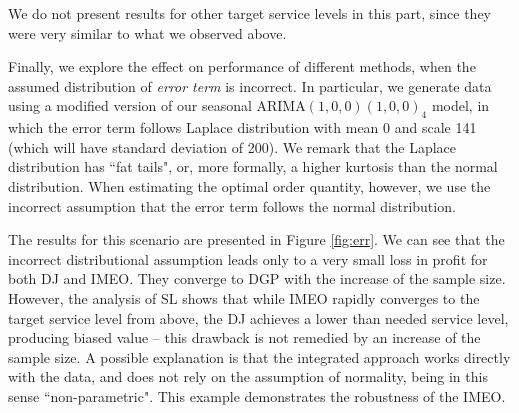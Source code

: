 \documentclass[a4paper,11pt]{article}
\begin{document}
We do not present results for other target service levels in this part, since they were very similar to what we observed above.
% 

Finally, we explore the effect on performance of different methods, when the assumed distribution of \emph{error term} is incorrect. In particular, we generate data using a modified version of our seasonal ARIMA$(1,0,0)(1,0,0)_4$ model, in which the error term follows Laplace distribution with mean 0 and scale 141 (which will have standard deviation of 200). We remark that the Laplace distribution has ``fat tails", or, more formally, a higher kurtosis than the normal distribution. When estimating the optimal order quantity, however, we use the incorrect assumption that the error term follows the normal distribution.

The results for this scenario are presented in Figure \ref{fig:err}. We can see that the incorrect distributional assumption leads only to a very small loss in profit for both DJ and IMEO. They converge to DGP with the increase of the sample size. However, the analysis of SL shows that while IMEO rapidly converges to the target service level from above, the DJ achieves a lower than needed service level, producing biased value -- this drawback is not remedied by an increase of the sample size. A possible explanation is that the integrated approach works directly with the data, and does not rely on the assumption of normality, being in this sense ``non-parametric". This example demonstrates the robustness of the IMEO.
\end{document}
